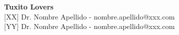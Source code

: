 \def\vhhistoryname{Revisiones}%
\def\vhversionname{Revisión}%
\def\vhdatename{Fecha}%
\def\vhauthorname{Autores}%
\def\vhchangename{Descripción}%

\begin{versionhistory}
\end{versionhistory}

\vspace{3cm}

\noindent\large\textbf{Tuxito Lovers}\\

\noindent\normalsize [XX] Dr. Nombre Apellido - nombre.apellido@xxx.com\\
\noindent\normalsize [YY] Dr. Nombre Apellido - nombre.apellido@xxx.com\\
